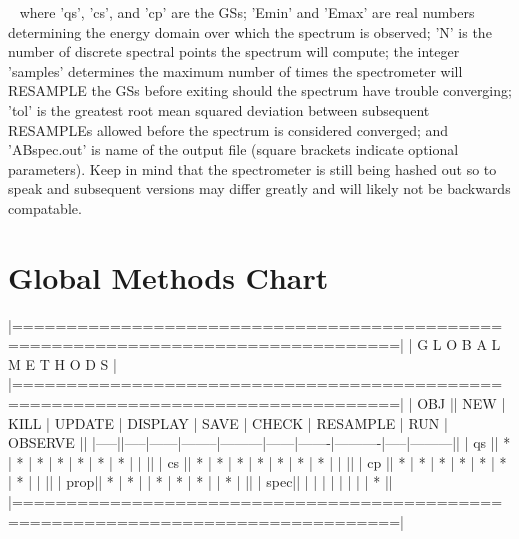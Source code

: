 ~\newline
where 'qs', 'cs', and 'cp' are the G\+Ss; 'Emin' and 'Emax' are real numbers determining the energy domain over which the spectrum is observed; 'N' is the number of discrete spectral points the spectrum will compute; the integer 'samples' determines the maximum number of times the spectrometer will R\+E\+S\+A\+M\+P\+L\+E the G\+Ss before exiting should the spectrum have trouble converging; 'tol' is the greatest root mean squared deviation between subsequent R\+E\+S\+A\+M\+P\+L\+Es allowed before the spectrum is considered converged; and 'A\+Bspec.\+out' is name of the output file (square brackets indicate optional parameters). Keep in mind that the spectrometer is still being hashed out so to speak and subsequent versions may differ greatly and will likely not be backwards compatable.~\newline
\hypertarget{_interface_Global_Methods_Chart}{}\section{Global Methods Chart}\label{_interface_Global_Methods_Chart}
\begin{DoxyVerb}|=================================================================================|
|                           G L O B A L   M E T H O D S                           |
|=================================================================================|
| OBJ || NEW | KILL | UPDATE | DISPLAY | SAVE | CHECK | RESAMPLE | RUN | OBSERVE ||
|-----||-----|------|--------|---------|------|-------|----------|-----|---------||
| qs  ||  *  |  *   |   *    |   *     |  *   |   *   |    *     |     |         ||
| cs  ||  *  |  *   |   *    |   *     |  *   |   *   |    *     |     |         ||
| cp  ||  *  |  *   |   *    |   *     |  *   |   *   |    *     |     |         ||
| prop||  *  |  *   |        |   *     |  *   |   *   |          |  *  |         ||
| spec||     |      |        |         |      |       |          |     |    *    ||
|=================================================================================|
\end{DoxyVerb}
 